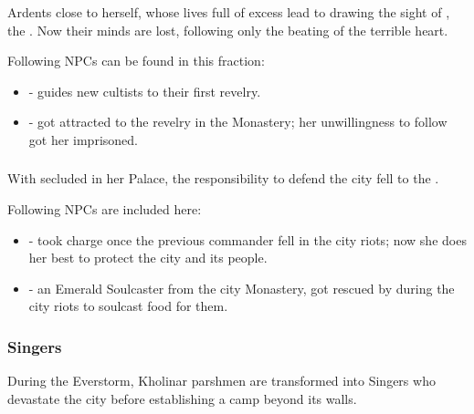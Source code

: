 \subsubsection{\npcFractionCult{}}

Ardents close to \npcQueen{} herself, whose lives full of excess lead to drawing the sight of \npcHeartRevel{}, the \npcHeartRevel{}. Now their minds are lost, following only the beating of the terrible heart.

Following NPCs can be found in this fraction:

\begin{itemize}
	\item \npcRevelerGuide[s]{} - guides new cultists to their first revelry.
	
	\item \npcRevelerGeneral[s]{} - got attracted to the revelry in the Monastery; her unwillingness to follow \npcHeartRevel{} got her imprisoned.
\end{itemize}



\subsubsection{\npcFractionWall{}}

With \npcQueen{} secluded in her Palace, the responsibility to defend the city fell to the \npcFractionWall{}. 

Following NPCs are included here:

\begin{itemize}
	\item \npcHighmarshal[s]{} - took charge once the previous commander fell in the city riots; now she does her best to protect the city and its people.
	
	\item \npcSoulcaster[s]{} - an Emerald Soulcaster from the city Monastery, got rescued by \npcHighmarshal{} during the city riots to soulcast food for them.
\end{itemize}



\subsubsection{Singers}

During the Everstorm, Kholinar parshmen are transformed into Singers who devastate the city before establishing a camp beyond its walls.

